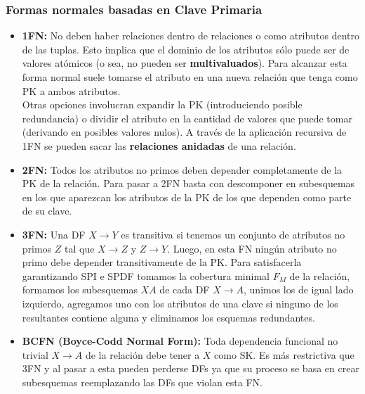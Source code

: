 \subsubsection*{Formas normales basadas en Clave Primaria}
\begin{itemize}
    \item \textbf{1FN:} No deben haber relaciones dentro de relaciones o como atributos dentro de las tuplas. Esto implica que el dominio de los atributos sólo puede ser de valores atómicos (o sea, no pueden ser \textbf{multivaluados}). Para alcanzar esta forma normal suele tomarse el atributo en una nueva relación que tenga como PK a ambos atributos. \\
    Otras opciones involucran expandir la PK (introduciendo posible redundancia) o dividir el atributo en la cantidad de valores que puede tomar (derivando en posibles valores nulos). A través de la aplicación recursiva de 1FN se pueden sacar las \textbf{relaciones anidadas} de una relación.
    \item \textbf{2FN:} Todos los atributos no primos deben depender completamente de la PK de la relación. Para pasar a 2FN basta con descomponer en subesquemas en los que aparezcan los atributos de la PK de los que dependen como parte de su clave.
    \item \textbf{3FN:} Una DF $X \rightarrow Y$ es transitiva si tenemos un conjunto de atributos no primos $Z$ tal que $X \rightarrow Z$ y $Z \rightarrow Y$. Luego, en esta FN ningún atributo no primo debe depender transitivamente de la PK. Para satisfacerla garantizando SPI e SPDF tomamos la cobertura minimal $F_M$ de la relación, formamos los subesquemas $XA$ de cada DF $X \rightarrow A$, unimos los de igual lado izquierdo, agregamos uno con los atributos de una clave si ninguno de los resultantes contiene alguna y eliminamos los esquemas redundantes.
    \item \textbf{BCFN (Boyce-Codd Normal Form):} Toda dependencia funcional no trivial $X \rightarrow A$ de la relación debe tener a $X$ como SK. Es más restrictiva que 3FN y al pasar a esta pueden perderse DFs ya que su proceso se basa en crear subesquemas reemplazando las DFs que violan esta FN.
\end{itemize}


